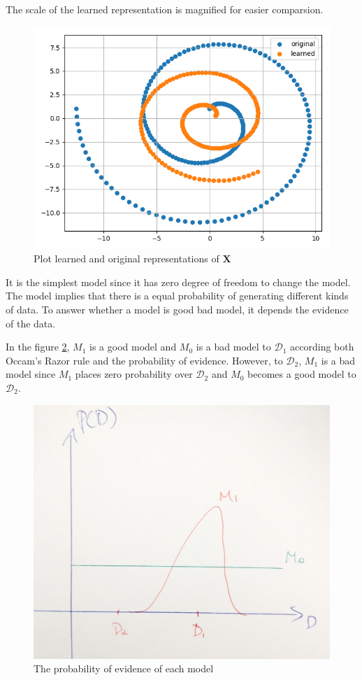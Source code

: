 \documentclass[12pt]{article}
\newenvironment{question}[2][Question]{\begin{trivlist}
\kern10pt
\item[\hskip \labelsep {\bfseries #1}\hskip \labelsep {\bfseries #2.}]}{\end{trivlist}}
\begin{document}
\begin{question}{16}
The scale of the learned representation is magnified for easier comparsion.
\begin{figure}[h!]
  \centering
  \includegraphics[width=0.5\linewidth]{fig/Q16-replearn.png}
  \caption{Plot learned and original representations of $\mathbf{X}$}
  \label{fig:q16-replearn}
\end{figure}
\end{question}

\begin{question}{17}
It is the simplest model since it has zero degree of freedom to change the model.
The model implies that there is a equal probability of generating different kinds of
data. To answer whether a model is good bad model, it depends the evidence
of the data. 

In the figure \ref{fig:q17-model-evidence}, $M_1$ is a good model and $M_0$ is a 
bad model to $\mathcal{D}_1$ according both Occam’s Razor rule and the probability
of evidence. However, to $\mathcal{D}_2$, $M_1$ is a bad model since $M_1$ places
zero probability over $\mathcal{D}_2$ and $M_0$ becomes a good model to $\mathcal{D}_2$.
\begin{figure}[h!] %
  \centering
  \includegraphics[width=0.5\linewidth]{fig/Q17.jpg}
  \caption{The probability of evidence of each model}
  \label{fig:q17-model-evidence}
\end{figure}
\end{question}
\end{document}
